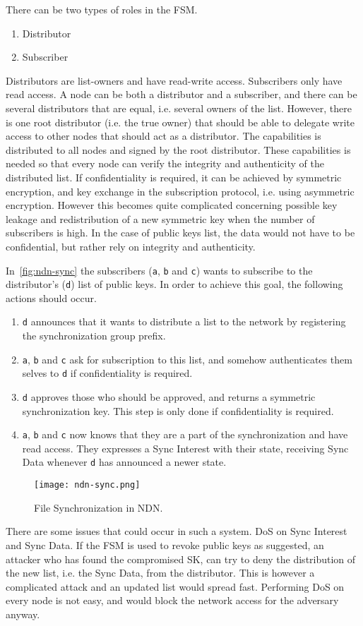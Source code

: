 There can be two types of roles in the \gls{FSM}. 
\begin{enumerate}
	\item Distributor
	\item Subscriber
\end{enumerate}
Distributors are list-owners and have read-write access.
Subscribers only have read access.
A node can be both a distributor and a subscriber, and there can be several distributors that are equal, i.e. several owners of the list.
However, there is one root distributor (i.e. the true owner) that should be able to delegate write access to other nodes that should act as a distributor. 
The capabilities is distributed to all nodes and signed by the root distributor.
These capabilities is needed so that every node can verify the integrity and authenticity of the distributed list.
If confidentiality is required, it can be achieved by symmetric encryption, and key exchange in the subscription protocol, i.e. using asymmetric encryption.
However this becomes quite complicated concerning possible key leakage and redistribution of a new symmetric key when the number of subscribers is high. 
In the case of public keys list, the data would not have to be confidential, but rather rely on integrity and authenticity.

In~\autoref{fig:ndn-sync} the subscribers (\texttt{a}, \texttt{b} and \texttt{c}) wants to subscribe to the distributor's (\texttt{d}) list of public keys.
In order to achieve this goal, the following actions should occur.
\begin{enumerate}
	\item \texttt{d} announces that it wants to distribute a list to the network by registering the synchronization group prefix. 
	\item \texttt{a}, \texttt{b} and \texttt{c} ask for subscription to this list, and somehow authenticates them selves to \texttt{d} if confidentiality is required.
	\item \texttt{d} approves those who should be approved, and returns a symmetric synchronization key. 
	This step is only done if confidentiality is required.
	\item \texttt{a}, \texttt{b} and \texttt{c} now knows that they are a part of the synchronization and have read access. They expresses a Sync Interest with their state, receiving Sync Data whenever \texttt{d} has announced a newer state.
\end{enumerate}

\begin{figure}[ht]
  \centering
  \texttt{[image: ndn-sync.png]}
  \caption{File Synchronization in NDN.}
  \label{fig:ndn-sync}
\end{figure}

There are some issues that could occur in such a system. 
\gls{DoS} on Sync Interest and Sync Data. 
If the \gls{FSM} is used to revoke public keys as suggested, an attacker who has found the compromised \gls{SK}, can try to deny the distribution of the new list, i.e. the Sync Data, from the distributor. 
This is however a complicated attack and an updated list would spread fast.
Performing \gls{DoS} on every node is not easy, and would block the network access for the adversary anyway.
